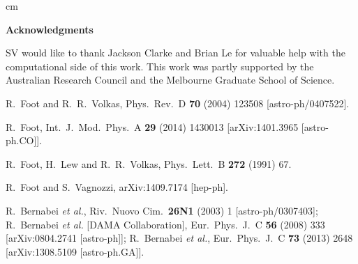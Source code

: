 \documentclass[12pt]{article}
\begin{document}

 cm

\newpage

\begin{flushleft}

{\Large \bf Acknowledgments}

\vskip 0.3cm
\noindent
SV would like to thank Jackson Clarke and Brian Le for valuable help with the computational side of this work. This work was partly supported by the Australian Research Council and the Melbourne Graduate School of Science.

\end{flushleft}

\vskip 0.2cm
\noindent


\begin{thebibliography}{999}

  R.~Foot and R.~R.~Volkas,
  Phys.\ Rev.\ D {\bf 70} (2004) 123508
  [astro-ph/0407522].

  R.~Foot,
  Int.\ J.\ Mod.\ Phys.\ A {\bf 29} (2014) 1430013
  [arXiv:1401.3965 [astro-ph.CO]].
  
  R.~Foot, H.~Lew and R.~R.~Volkas,
  Phys.\ Lett.\ B {\bf 272} (1991) 67.

  R.~Foot and S.~Vagnozzi,
  arXiv:1409.7174 [hep-ph].
  
  R.~Bernabei {\it et al.},
  Riv.\ Nuovo Cim.\  {\bf 26N1} (2003) 1
  [astro-ph/0307403];
  R.~Bernabei {\it et al.}  [DAMA Collaboration],
  Eur.\ Phys.\ J.\ C {\bf 56} (2008) 333
  [arXiv:0804.2741 [astro-ph]];
  R.~Bernabei {\it et al.},
  Eur.\ Phys.\ J.\ C {\bf 73} (2013) 2648
  [arXiv:1308.5109 [astro-ph.GA]].
  

\end{thebibliography}
\end{document}
